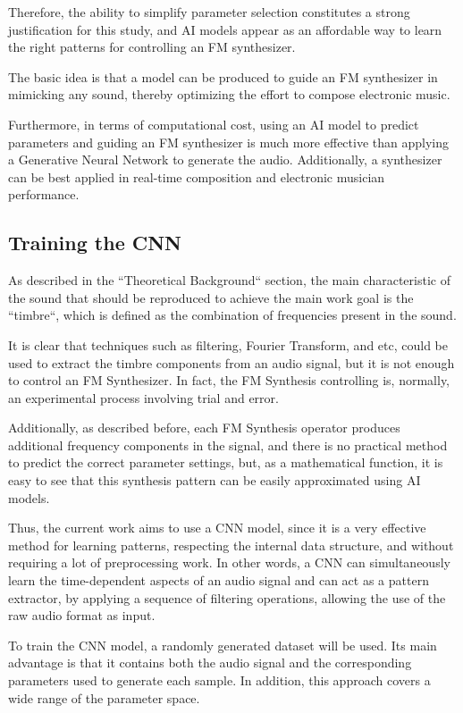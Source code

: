\documentclass[sigconf,natbib=false]{acmart}
\begin{document}
Therefore, the ability to simplify parameter selection constitutes a strong justification for this study, and AI models appear as an affordable way to learn the right patterns for controlling an FM synthesizer.

The basic idea is that a model can be produced to guide an FM synthesizer in mimicking any sound, thereby optimizing the effort to compose electronic music.

Furthermore, in terms of computational cost, using an AI model to predict parameters and guiding an FM synthesizer is much more effective than applying a Generative Neural Network to generate the audio. Additionally, a synthesizer can be best applied in real-time composition and electronic musician performance.

\subsection{Training the CNN}

As described in the ``Theoretical Background`` section, the main characteristic of the sound that should be reproduced to achieve the main work goal is the ``timbre``, which is defined as the combination of frequencies present in the sound.

It is clear that techniques such as filtering, Fourier Transform, and etc, could be used to extract the timbre components from an audio signal, but it is not enough to control an FM Synthesizer. In fact, the FM Synthesis controlling is, normally, an experimental process involving trial and error.

Additionally, as described before, each FM Synthesis operator produces additional frequency components in the signal, and there is no practical method to predict the correct parameter settings, but, as a mathematical function, it is easy to see that this synthesis pattern can be easily approximated using AI models.

Thus, the current work aims to use a CNN model, since it is a very effective method for learning patterns, respecting the internal data structure, and without requiring a lot of preprocessing work.
In other words, a CNN can simultaneously learn the time-dependent aspects of an audio signal and can act as a pattern extractor, by applying a sequence of filtering operations, allowing the use of the raw audio format as input.

To train the CNN model, a randomly generated dataset will be used. Its main advantage is that it contains both the audio signal and the corresponding parameters used to generate each sample. In addition, this approach covers a wide range of the parameter space.
\end{document}
